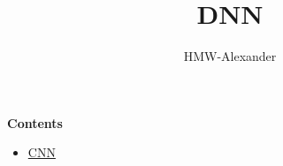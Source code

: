 \documentclass[letterpaper,11pt]{article}
\title{\textbf{DNN}}
\author{HMW-Alexander}
\begin{document}
\maketitle

\textbf{Contents}
\begin{itemize}
	\item \href{./CNN/index.html}{CNN}
\end{itemize}
	
\end{document}
